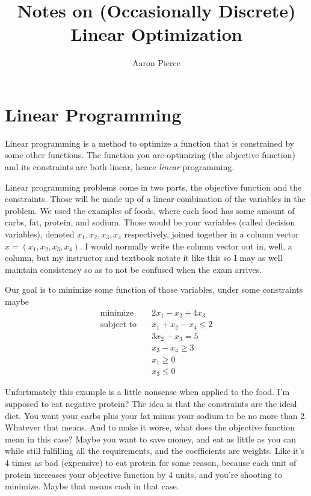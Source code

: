 \documentclass[12pt, letterpaper]{article}
\title{Notes on (Occasionally Discrete) Linear Optimization}
\author{Aaron Pierce}
\date{} %
\begin{document}
\maketitle

\tableofcontents

\newpage

\section{Linear Programming}

Linear programming is a method to optimize a function that is constrained by some other functions.
The function you are optimizing (the objective function) and its constraints are both linear, hence \emph{linear} programming.

Linear programming problems come in two parts, the objective function and the constraints.
Those will be made up of a linear combination of the variables in the problem.
We used the examples of foods, where each food has some amount of carbs, fat, protein, and sodium.
Those would be your variables (called decision variables), denoted $x_1, x_2, x_3, x_4$ respectively, joined together in a column
vector $x = (x_1, x_2, x_3, x_4)$. I would normally write the column vector out in, well, a column,
but my instructor and textbook notate it like this so I may as well maintain consistency so as to not
be confused when the exam arrives.

Our goal is to minimize some function of those variables, under some constraints maybe 
\begin{align*}
    \text{minimize} \quad  & 2x_1 - x_2 + 4x_3  \\
    \text{subject to} \quad &x_1 +  x_2 - x_4 \leq 2\\
    & 3x_2 - x_3 = 5\\
    & x_3 - x_4 \geq 3\\
    & x_1 \geq 0 \\
    & x_3 \leq 0
\end{align*}

Unfortunately this example is a little nonsense when applied to the food.
I'm supposed to eat negative protein?
The idea is that the constraints are the ideal diet.
You want your carbs plus your fat minus your sodium to be no more than 2.
Whatever that means.
And to make it worse, what does the objective function mean in this case?
Maybe you want to save money, and eat as little as you can while still
fulfilling all the requirements, and the coefficients are weights.
Like it's 4 times as bad (expensive) to eat protein for some reason, because each unit of protein
increases your objective function by 4 units, and you're shooting to minimize.
Maybe that means cash in that case.
\end{document}
